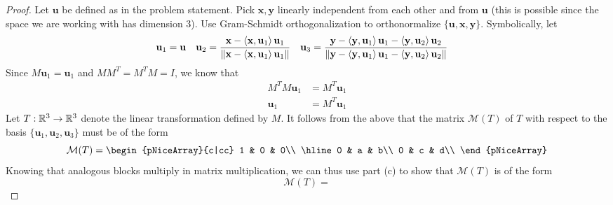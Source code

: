 \documentclass[../psets.tex]{subfiles}
\begin{document}
\begin{enumerate}
\begin{enumerate}
        \begin{proof}


            Let $\mathbf{u}$ be defined as in the problem statement. Pick $\mathbf{x},\mathbf{y}$ linearly independent from each other and from $\mathbf{u}$ (this is possible since the space we are working with has dimension 3). Use Gram-Schmidt orthogonalization to orthonormalize $\{\mathbf{u},\mathbf{x},\mathbf{y}\}$. Symbolically, let
            \begin{align*}
                \mathbf{u}_1 &= \mathbf{u}&
                \mathbf{u}_2 &= \frac{\mathbf{x}-\left\langle{\mathbf{x}},{\mathbf{u}_1}\right\rangle\mathbf{u}_1}{\norm{\mathbf{x}-\left\langle{\mathbf{x}},{\mathbf{u}_1}\right\rangle\mathbf{u}_1}}&
                \mathbf{u}_3 &= \frac{\mathbf{y}-\left\langle{\mathbf{y}},{\mathbf{u}_1}\right\rangle\mathbf{u}_1-\left\langle{\mathbf{y}},{\mathbf{u}_2}\right\rangle\mathbf{u}_2}{\norm{\mathbf{y}-\left\langle{\mathbf{y}},{\mathbf{u}_1}\right\rangle\mathbf{u}_1-\left\langle{\mathbf{y}},{\mathbf{u}_2}\right\rangle\mathbf{u}_2}}
            \end{align*}
            Since $M\mathbf{u}_1=\mathbf{u}_1$ and $MM^T=M^TM=I$, we know that
            \begin{align*}
                M^TM\mathbf{u}_1 &= M^T\mathbf{u}_1\\
                \mathbf{u}_1 &= M^T\mathbf{u}_1
            \end{align*}
            Let $T:\mathbb{R}^3\to\mathbb{R}^3$ denote the linear transformation defined by $M$. It follows from the above that the matrix $\mathcal{M}(T)$ of $T$ with respect to the basis $\{\mathbf{u}_1,\mathbf{u}_2,\mathbf{u}_3\}$ must be of the form
            \begin{equation*}
                \mathcal{M}(T) =
                \begin{pNiceArray}{c|cc}
                    1 & 0 & 0\\
                    \hline
                    0 & a & b\\
                    0 & c & d\\
                \end{pNiceArray}
            \end{equation*}
            Knowing that analogous blocks multiply in matrix multiplication, we can thus use part (c) to show that $\mathcal{M}(T)$ is of the form
            \begin{equation*}
                \mathcal{M}(T) =

\end{equation*}
\end{proof}
\end{enumerate}
\end{enumerate}
\end{document}
